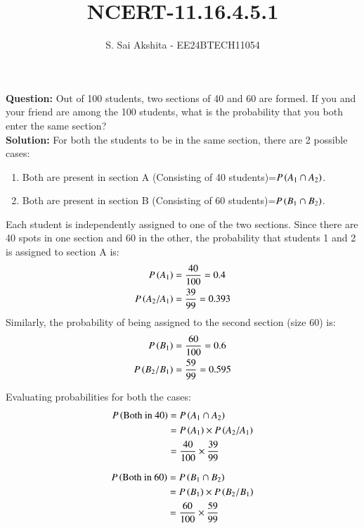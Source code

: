\documentclass[journal,12pt,onecolumn]{IEEEtran}
\theoremstyle{remark}
\begin{document}

\vspace{3cm}

\title{NCERT-11.16.4.5.1}
\author{S. Sai Akshita - EE24BTECH11054}
\newpage
\maketitle
\bigskip

\renewcommand{\thefigure}{\theenumi}
\renewcommand{\thetable}{\theenumi}
\textbf{Question:} Out of 100 students, two sections of 40 and 60 are formed. If you and your friend
are among the 100 students, what is the probability that you both enter the same section?\\
\textbf{Solution:} For both the students to be in the same section, there are 2 possible cases:\\
\begin{enumerate}
    \item Both are present in section A (Consisting of 40 students)=$P\left(A_1\cap A_2\right)$. \\
    \item Both are present in section B (Consisting of 60 students)=$P\left(B_1\cap B_2\right)$.
\end{enumerate}

Each student is independently assigned to one of the two sections. Since there are 40 spots in one section and 60 in the other, the probability that students 1 and 2 is assigned to section A is:
\begin{align}
    P\left(A_1\right) &= \frac{40}{100} = 0.4\\
    P\left(A_2/A_1\right) &= \frac{39}{99} =0.393
\end{align}
Similarly, the probability of being assigned to the second section (size 60) is:
\begin{align}
P\left(B_1\right) &= \frac{60}{100} = 0.6\\
P\left(B_2/B_1\right) &= \frac{59}{99} = 0.595
\end{align}

Evaluating probabilities for both the cases:
\begin{align}
    P\left(\text{Both in 40}\right)&=P\left(A_1\cap A_2\right)\\
    &=P\left(A_1\right)\times P\left(A_2/A_1\right)\\
    &= \frac{40}{100} \times \frac{39}{99}
\end{align}

\begin{align}
    P\left(\text{Both in 60}\right)&=P\left(B_1\cap B_2\right)\\
    &=P\left(B_1\right)\times P\left(B_2/B_1\right)\\
    &= \frac{60}{100} \times \frac{59}{99}
\end{align}
\end{document}
